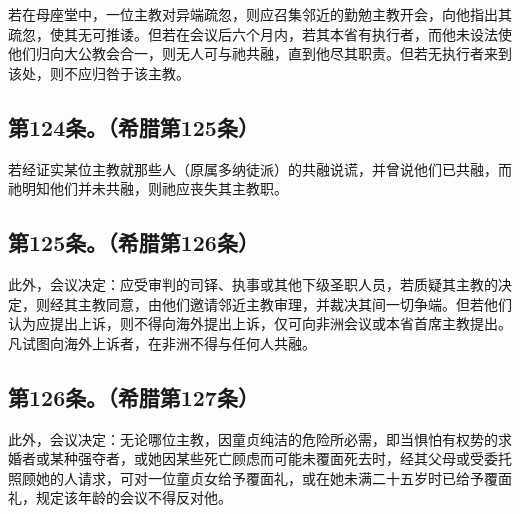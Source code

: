 \par

若在母座堂中，一位主教对异端疏忽，则应召集邻近的勤勉主教开会，向他指出其疏忽，使其无可推诿。但若在会议后六个月内，若其本省有执行者，而他未设法使他们归向大公教会合一，则无人可与祂共融，直到他尽其职责。但若无执行者来到该处，则不应归咎于该主教。\par


\subsection{第124条。（希腊第125条）}

\par

若经证实某位主教就那些人（原属多纳徒派）的共融说谎，并曾说他们已共融，而祂明知他们并未共融，则祂应丧失其主教职。\par


\subsection{第125条。（希腊第126条）}

\par

此外，会议决定：应受审判的司铎、执事或其他下级圣职人员，若质疑其主教的决定，则经其主教同意，由他们邀请邻近主教审理，并裁决其间一切争端。但若他们认为应提出上诉，则不得向海外提出上诉，仅可向非洲会议或本省首席主教提出。凡试图向海外上诉者，在非洲不得与任何人共融。\par


\subsection{第126条。（希腊第127条）}

\par

此外，会议决定：无论哪位主教，因童贞纯洁的危险所必需，即当惧怕有权势的求婚者或某种强夺者，或她因某些死亡顾虑而可能未覆面死去时，经其父母或受委托照顾她的人请求，可对一位童贞女给予覆面礼，或在她未满二十五岁时已给予覆面礼，规定该年龄的会议不得反对他。\par

